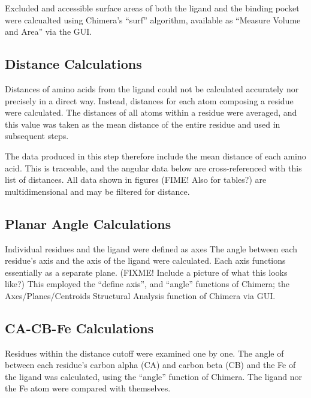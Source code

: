 \documentclass[a4paper, nobind]{templates/ociamthesis}
\begin{document}
Excluded and accessible surface areas of both the ligand and the binding pocket were calcualted using Chimera's ``surf'' algorithm, available as ``Measure Volume and Area'' via the GUI.

\hypertarget{distance-calculations}{%
\subsection{Distance Calculations}\label{distance-calculations}}

Distances of amino acids from the ligand could not be calculated accurately nor precisely in a direct way. Instead, distances for each atom composing a residue were calculated. The distances of all atoms within a residue were averaged, and this value was taken as the mean distance of the entire residue and used in subsequent steps.

The data produced in this step therefore include the mean distance of each amino acid. This is traceable, and the angular data below are cross-referenced with this list of distances. All data shown in figures (FIME! Also for tables?) are multidimensional and may be filtered for distance.

\hypertarget{planar-angle-calculations}{%
\subsection{Planar Angle Calculations}\label{planar-angle-calculations}}

Individual residues and the ligand were defined as axes The angle between each residue's axis and the axis of the ligand were calculated. Each axis functions essentially as a separate plane. (FIXME! Include a picture of what this looks like?) This employed the ``define axis'', and ``angle'' functions of Chimera; the Axes/Planes/Centroids Structural Analysis function of Chimera via GUI.

\hypertarget{ca-cb-fe-calculations}{%
\subsection{CA-CB-Fe Calculations}\label{ca-cb-fe-calculations}}

Residues within the distance cutoff were examined one by one. The angle of between each residue's carbon alpha (CA) and carbon beta (CB) and the Fe of the ligand was calculated, using the ``angle'' function of Chimera. The ligand nor the Fe atom were compared with themselves.
\end{document}
